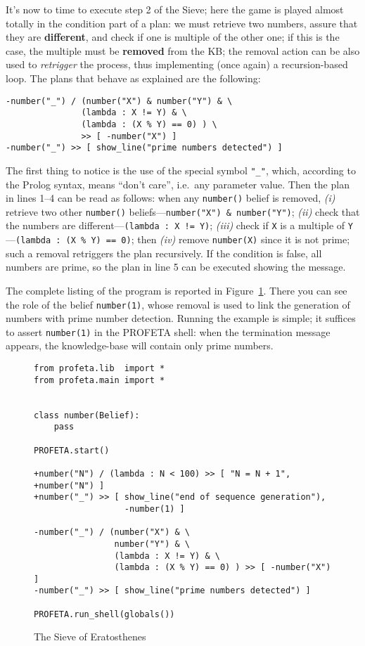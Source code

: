 It's now to time to execute step 2 of the Sieve; here the game is played
almost totally in the condition part of a plan: we must retrieve two
numbers, assure that they are \textbf{different}, and check if one is
multiple of the other one; if this is the case, the multiple must be
\textbf{removed} from the KB; the removal action can be also used to
\emph{retrigger} the process, thus implementing (once again) a
recursion-based loop.
The plans that behave as explained are the following:
\python%
\begin{lstlisting}
-number("_") / (number("X") & number("Y") & \
               (lambda : X != Y) & \
               (lambda : (X % Y) == 0) ) \
               >> [ -number("X") ]
-number("_") >> [ show_line("prime numbers detected") ]
\end{lstlisting}
The first thing to notice is the use of the special symbol \texttt{"\_"},
which, according to the Prolog syntax, means ``don't care'', i.e.~any
parameter value.
Then the plan in lines 1--4 can be read as follows: when any
\texttt{number()} belief is removed, \emph{(i)} retrieve two other \texttt{number()}
beliefs---\verb+number("X") & number("Y")+; \emph{(ii)} check that the
numbers are different---\verb+(lambda : X != Y)+; \emph{(iii)} check if
\texttt{X} is a multiple of \texttt{Y}---\verb+(lambda : (X % Y) == 0)+;
then \emph{(iv)} remove \texttt{number(X)} since it is not prime; such a
removal retriggers the plan recursively.
If the condition is false, all numbers are prime, so the plan in line 5 can
be executed showing the message.

The complete listing of the program is reported in Figure~\ref{fig:sieve}.
There you can see the role of the belief \texttt{number(1)}, whose removal
is used to link the generation of numbers with prime number detection.
Running the example is simple; it suffices to assert
\texttt{number(1)} in the PROFETA shell: when the termination message
appears, the knowledge-base will contain only prime numbers.

\begin{figure}[b!]
\python%
\begin{lstlisting}
from profeta.lib  import *
from profeta.main import *


class number(Belief):
    pass

PROFETA.start()

+number("N") / (lambda : N < 100) >> [ "N = N + 1", +number("N") ]
+number("_") >> [ show_line("end of sequence generation"),
                  -number(1) ]

-number("_") / (number("X") & \
                number("Y") & \
                (lambda : X != Y) & \
                (lambda : (X % Y) == 0) ) >> [ -number("X") ]
-number("_") >> [ show_line("prime numbers detected") ]

PROFETA.run_shell(globals())
\end{lstlisting}
\caption{The Sieve of Eratosthenes}\label{fig:sieve}
\end{figure}




